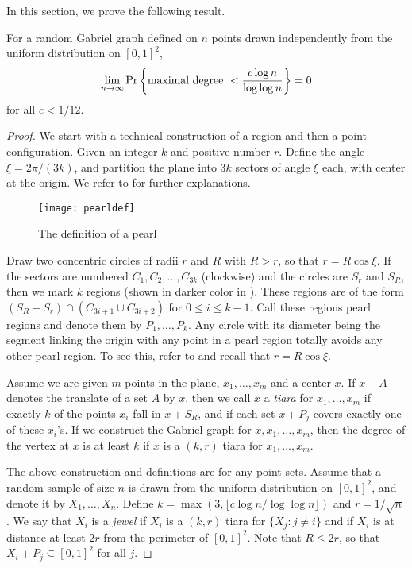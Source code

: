 \documentclass[lotsofwhite,charterfonts]{patmorin}
\newcommand{\PROB}{\Pr}
\begin{document}
In this section, we prove the following result.

\begin{thm}
For a random Gabriel graph defined on $n$ points drawn
independently from the uniform distribution on
$[0,1]^2$, 
\[
\lim_{n\to\infty} \PROB \left\{ \hbox{\rm maximal degree}~< {c \log n \over
\log \log n} \right\} = 0
\]
for all $c < 1/12$.
\end{thm}

\begin{proof}
We start with a technical construction of a region
and then a point configuration.
Given an integer $k$ and positive number $r$.
Define the angle $\xi = 2\pi / (3k)$,
and partition the plane into $3k$ sectors
of angle $\xi$ each, with center at the origin.
We refer to  for further explanations.

\begin{figure}[htbp]
\begin{center}\texttt{[image: pearldef]}\end{center}
\caption{The definition of a pearl}
\end{figure}

Draw two concentric circles of radii $r$ and $R$
with $R > r$, so that $r = R \cos \xi$.
If the sectors are numbered $C_1, C_2, \ldots, C_{3k}$
(clockwise)
and the circles are $S_r$ and $S_R$, then we
mark $k$ regions (shown in darker color in ). These regions are of the form
$(S_R - S_r) \cap (C_{3i+1} \cup C_{3i+2})$ for
$0 \le i \le k-1$. 
Call these regions pearl regions
and denote them by $P_1 , \ldots, P_k$.
Any circle with
its diameter being the segment linking the origin with
any point in a pearl region totally avoids any other
pearl region. To see this, refer to 
and recall that $r = R \cos \xi$.

Assume we are given $m$ points in the plane,
$x_1,\ldots,x_m$ and a center $x$.
If $x+A$ denotes the translate of a set $A$ by $x$,
then we call $x$ a {\it tiara} for $x_1 , \ldots , x_m$
if exactly $k$ of the points $x_i$ fall in $x+S_R$,
and if each set $x+P_j$ covers exactly one of
these $x_i$'s.
If we construct the Gabriel graph for $x,x_1,\ldots,x_m$,
then the degree of the vertex at $x$ is at least $k$
if $x$ is a $(k,r)$ tiara for $x_1,\ldots,x_m$.

The above construction and definitions are
for any point sets.
Assume that a random sample of size $n$ is drawn
from the uniform distribution on $[0,1]^2$,
and denote it by $X_1 , \ldots, X_n$.
Define $k = \max( 3, \lfloor c \log n / \log \log n \rfloor)$
and $r = 1/\sqrt{n}$.
We say that $X_i$ is a {\it jewel}
if $X_i$ is a $(k,r)$ tiara for $\{ X_j : j \not= i \}$
and if $X_i$ is at distance at least $2r$ from the
perimeter of $[0,1]^2$. Note that $R \le 2r$, so that
$X_i + P_j \subseteq [0,1]^2$ for all $j$.


\end{proof}
\end{document}
